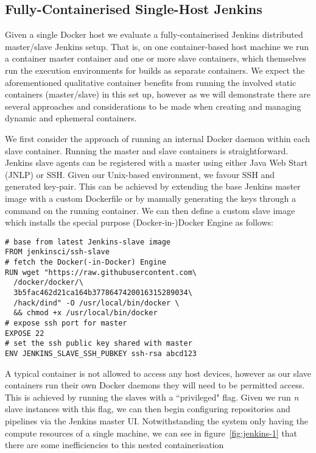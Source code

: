 \documentclass[journal]{IEEEtran}
\begin{document}
\subsection{Fully-Containerised Single-Host Jenkins}
Given a single Docker host we evaluate a fully-containerised Jenkins 
distributed master/slave Jenkins setup. That is, on one container-based
host machine we run a container master container and one or more slave containers,
which themselves run the execution environments for builds as separate containers. 
We expect the aforementioned qualitative container benefits from running the involved static 
containers (master/slave) in this set up, however as we will demonstrate 
there are several approaches and considerations to be made when creating and managing
dynamic and ephemeral containers.
\par
We first consider the approach of running an internal Docker daemon within
each slave container. Running the master and slave containers is straightforward. 
Jenkins slave agents can be registered with a master using either Java Web Start (JNLP) or SSH.
Given our Unix-based environment, we favour SSH and generated key-pair. This can be 
achieved by extending the base Jenkins master image with a custom Dockerfile or 
by manually generating the keys through a command on the running container. 
We can then define a custom slave image which installs the special purpose (Docker-in-)Docker 
Engine as follows:
\begin{verbatim}
# base from latest Jenkins-slave image
FROM jenkinsci/ssh-slave
# fetch the Docker(-in-Docker) Engine
RUN wget "https://raw.githubusercontent.com\
  /docker/docker/\
  3b5fac462d21ca164b3778647420016315289034\
  /hack/dind" -O /usr/local/bin/docker \
  && chmod +x /usr/local/bin/docker
# expose ssh port for master
EXPOSE 22
# set the ssh public key shared with master
ENV JENKINS_SLAVE_SSH_PUBKEY ssh-rsa abcd123
\end{verbatim}	
A typical container is not allowed to access any host devices,
however as our slave containers run their own Docker daemons they will need to be permitted access. 
This is achieved by running the slaves with a ``privileged" flag. Given we run \textit{n} slave instances
with this flag, we can then begin configuring repositories and pipelines via the
Jenkins master UI. Notwithstanding the system only having the compute resources of a single machine, 
we can see in figure~\ref{fig:jenkins-1} that there are some inefficiencies to this nested containerisation
\end{document}
